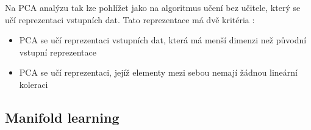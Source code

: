 Na PCA analýzu tak lze pohlížet jako na algoritmus učení bez učitele, který se učí reprezentaci vstupních dat. Tato reprezentace má dvě kritéria \cite{Goodfellow2016}:

\begin{itemize}
    \item PCA se učí reprezentaci vstupních dat, která má menší dimenzi než původní vstupní reprezentace
    \item PCA se učí reprezentaci, jejíž elementy mezi sebou nemají žádnou lineární koleraci
\end{itemize}

\subsection{Manifold learning}